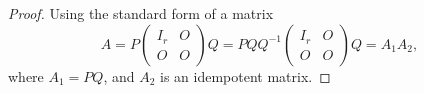 \begin{proof}
  Using the standard form of a matrix
  \begin{equation}
    A = P \left(
      \begin{array}{cc}
        I_r&O\\
        O&O
      \end{array}
    \right)Q = PQ Q^{-1} \left(
      \begin{array}{cc}
        I_r&O\\
        O&O
      \end{array}
    \right) Q = A_1A_2,
  \end{equation}
  where $A_1 = PQ$, and $A_2$ is an idempotent matrix.
\end{proof}





